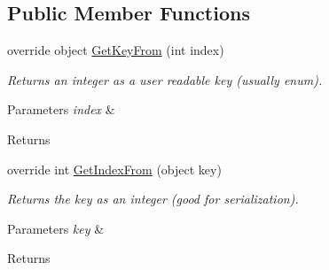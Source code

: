 \subsection*{Public Member Functions}
\begin{DoxyCompactItemize}
\item 
\hypertarget{class_skyrates_1_1_client_1_1_ship_1_1_ship_component_list_a85071fae3afe111dc7e0c55d2adbb943}{override object \hyperlink{class_skyrates_1_1_client_1_1_ship_1_1_ship_component_list_a85071fae3afe111dc7e0c55d2adbb943}{Get\-Key\-From} (int index)}\label{class_skyrates_1_1_client_1_1_ship_1_1_ship_component_list_a85071fae3afe111dc7e0c55d2adbb943}

\begin{DoxyCompactList}\small\item\em Returns an integer as a user readable key (usually enum). 


\begin{DoxyParams}{Parameters}
{\em index} & \\
\hline
\end{DoxyParams}
\begin{DoxyReturn}{Returns}

\end{DoxyReturn}
 \end{DoxyCompactList}\item 
\hypertarget{class_skyrates_1_1_client_1_1_ship_1_1_ship_component_list_abf13fa8e7ce34e01168bf2246fc6f20a}{override int \hyperlink{class_skyrates_1_1_client_1_1_ship_1_1_ship_component_list_abf13fa8e7ce34e01168bf2246fc6f20a}{Get\-Index\-From} (object key)}\label{class_skyrates_1_1_client_1_1_ship_1_1_ship_component_list_abf13fa8e7ce34e01168bf2246fc6f20a}

\begin{DoxyCompactList}\small\item\em Returns the key as an integer (good for serialization). 


\begin{DoxyParams}{Parameters}
{\em key} & \\
\hline
\end{DoxyParams}
\begin{DoxyReturn}{Returns}


\end{DoxyReturn}
\end{DoxyCompactList}
\end{DoxyCompactItemize}
